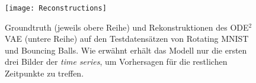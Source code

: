 \documentclass[12pt]{article}
\begin{document}
\begin{figure}
\begin{minipage}[position=l]{0.33\textwidth}
\begin{mdframed}[style=inner]
			\end{mdframed}
		\end{minipage}
		\begin{minipage}[position=r]{0.67\textwidth}
			\begin{mdframed}[style=inner]
				\texttt{[image: Reconstructions]}
			\end{mdframed}
		\end{minipage}
		\caption{Groundtruth (jeweils obere Reihe) und Rekonstruktionen des ODE$^2$VAE (untere Reihe) auf den Testdatensätzen von Rotating MNIST und Bouncing Balls. Wie erwähnt erhält das Modell nur die ersten drei Bilder der \emph{time series}, um Vorhersagen für die restlichen Zeitpunkte zu treffen.}
	\end{figure}
\end{document}
